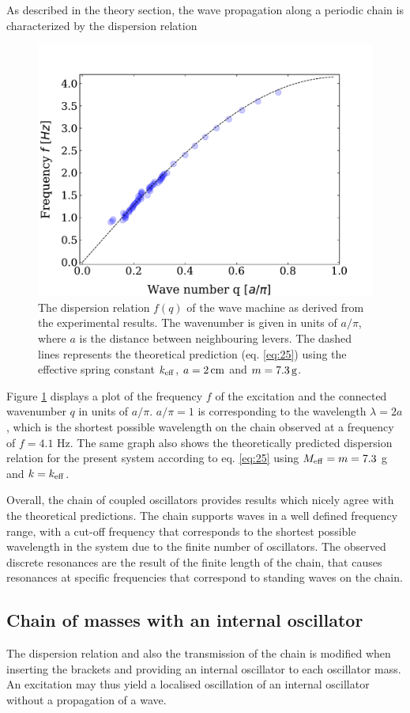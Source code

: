 \documentclass[12pt]{article}
\begin{document}
As described in the theory section, the wave propagation along a periodic chain is characterized by the dispersion relation

\begin{figure}[hbt]
  \includegraphics[width=0.5\columnwidth]{results/dispersion_simple_chain.pdf}
  \caption{The dispersion relation $f(q)$ of the wave machine as derived from the experimental results. The wavenumber is given in units of $a/\pi$, where $a$ is the distance between neighbouring levers. The dashed lines represents the theoretical prediction (eq. \ref{eq:25}) using the effective spring constant $k_{\rm eff}$, $a=2\,{\rm cm}$ and $m=7.3\, {\rm g}$.}\label{fig:figure18}
\end{figure}
 
 Figure \ref{fig:figure18} displays a plot of the frequency $f$ of the excitation and the connected wavenumber $q$ in units of $a/\pi$. $a/\pi=1$ is corresponding to the wavelength $\lambda=2a$, which is the shortest possible wavelength on the chain observed at a frequency of $f=4.1$ Hz. The same graph also shows the theoretically predicted dispersion relation for the present system according to eq. \ref{eq:25} using $M_{\rm eff}=m=7.3$ g and $k=k_{\rm eff}$. 
 
 Overall, the chain of coupled oscillators provides results which nicely agree with the theoretical predictions. The chain supports waves in a well defined frequency range, with a cut-off frequency that corresponds to the shortest possible wavelength in the system due to the finite number of oscillators. The observed discrete resonances are the result of the finite length of the chain, that causes resonances at specific frequencies that correspond to standing waves on the chain.
 
\subsection{Chain of masses with an internal oscillator}
The dispersion relation and also the transmission of the chain is modified when inserting the brackets and providing an internal oscillator to each oscillator mass. An excitation may thus yield a localised oscillation of an internal oscillator without a propagation of a wave.
\end{document}
